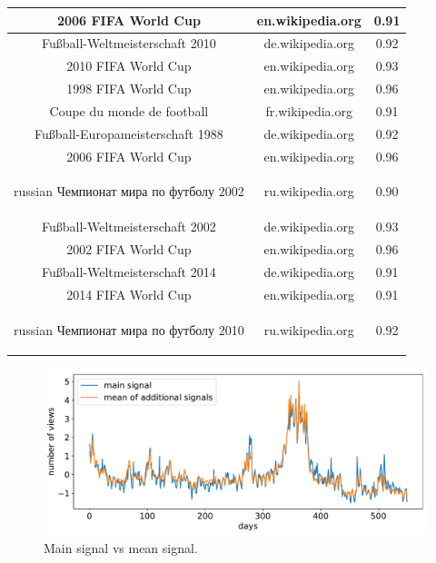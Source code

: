 \begin{enumerate}
\begin{center}
\begin{tabular}{|c|c|c|}
		2006 FIFA World Cup & en.wikipedia.org & 0.91 \\ \hline
		Fußball-Weltmeisterschaft 2010 & de.wikipedia.org & 0.92 \\ \hline
		2010 FIFA World Cup & en.wikipedia.org & 0.93 \\ \hline
		1998 FIFA World Cup & en.wikipedia.org &  0.96 \\ \hline
		Coupe du monde  de football   & fr.wikipedia.org & 0.91 \\ \hline
		Fußball-Europameisterschaft 1988 & de.wikipedia.org & 0.92 \\ \hline
		2006  FIFA World Cup & en.wikipedia.org &  0.96 \\ \hline
		\begin{otherlanguage*}{russian}
		Чемпионат мира по футболу 2002 
		\end{otherlanguage*}
		 & ru.wikipedia.org & 0.90 \\ \hline
		Fußball-Weltmeisterschaft 2002 & de.wikipedia.org &  0.93 \\ \hline
		2002 FIFA World Cup & en.wikipedia.org & 0.96 \\ \hline
		Fußball-Weltmeisterschaft 2014 & de.wikipedia.org & 0.91 \\ \hline
		2014 FIFA World Cup & en.wikipedia.org & 0.91 \\ \hline
		\begin{otherlanguage*}{russian}
		Чемпионат мира по футболу 2010 
		\end{otherlanguage*}
		& ru.wikipedia.org & 0.92 \\ \hline
		
 	\end{tabular}
 	\end{center}
	 
	 
     \begin{figure}[h]     
      \includegraphics[width=\textwidth]{./description/images/meanvsmain}
         \caption{Main signal vs mean signal.}\label{fig:meanvsmain}
     \end{figure}
	 
	
	 
 \end{enumerate}
 
